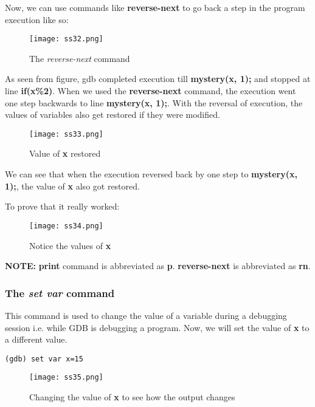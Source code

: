 \documentclass{article}
\makeatletter
\renewcommand\paragraph{\@startsection{paragraph}{4}{\z@}{-3.25ex \@plus -1ex \@minus -.2ex}{1.5ex \@plus .2ex}{\normalfont\normalsize\bfseries}}
\makeatother
\begin{document}
Now, we can use commands like \textbf{reverse-next} to go back a step in the program execution like so:

\begin{figure}[h]
\centering
\texttt{[image: ss32.png]}
\caption{The \textit{reverse-next} command}
\end{figure}

As seen from figure, gdb completed execution till \textbf{mystery(x, 1);} and stopped at line \textbf{if(x\%2)}. When we used the \textbf{reverse-next} command, the execution went one step backwards to line \textbf{mystery(x, 1);}. With the reversal of execution, the values of variables also get restored if they were modified.

\begin{figure}[h]
\centering
\texttt{[image: ss33.png]}
\caption{Value of \textbf{x} restored}
\end{figure}

We can see that when the execution reversed back by one step to \textbf{mystery(x, 1);}, the value of \textbf{x} also got restored.

\newpage
To prove that it really worked:
\begin{figure}[h]
\centering
\texttt{[image: ss34.png]}
\caption{Notice the values of \textbf{x}}
\end{figure}

\textbf{NOTE:} \textbf{print} command is abbreviated as \textbf{p}. \textbf{reverse-next} is abbreviated as \textbf{rn}.

\subsubsection{The \textit{set var} command}
\paragraph{}
This command is used to change the value of a variable during a debugging session i.e. while GDB is debugging a program.
\newpage
Now, we will set the value of \textbf{x} to a different value.

\begin{Verbatim}[frame=single]
(gdb) set var x=15
\end{Verbatim}

\begin{figure}[h]
\centering
\texttt{[image: ss35.png]}
\caption{Changing the value of \textbf{x} to see how the output changes}
\end{figure}
\end{document}
